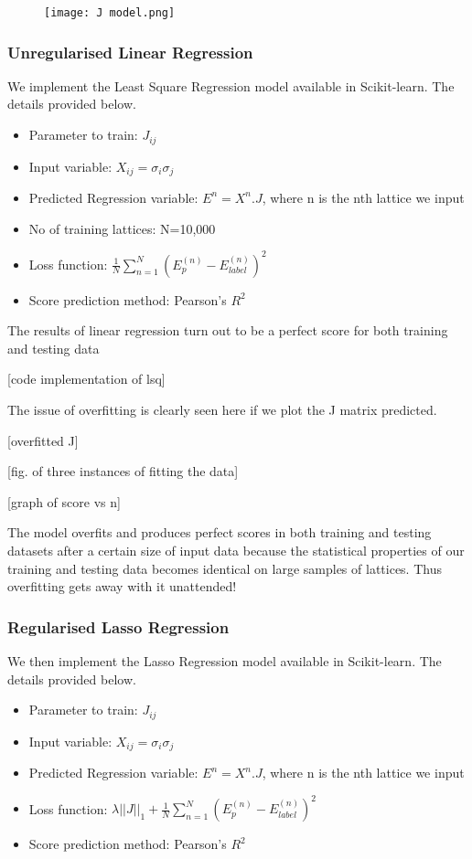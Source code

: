 \begin{figure}
    \centering
    \texttt{[image: J model.png]}
    \label{J matrix for nearest neighbour interaction}
\end{figure}

\subsubsection{Unregularised Linear Regression}
We implement the Least Square Regression model available in Scikit-learn. The details provided below.
\begin{itemize}
    \item Parameter to train: \(J_{ij}\)
    \item Input variable: \(X_{ij}=\sigma_i\sigma_j\)
    \item Predicted Regression variable: \(E^n=X^n.J\), where n is the nth lattice we input
    \item No of training lattices: N=10,000
    \item Loss function: \(\frac{1}{N} \sum_{n=1}^N(E_p^{(n)}-E_{label}^{(n)})^2\)
    \item Score prediction method: Pearson's \(R^2\)
\end{itemize}

The results of linear regression turn out to be a perfect score for both training and testing data 

[code implementation of lsq]

The issue of overfitting is clearly seen here if we plot the J matrix predicted.

[overfitted J]

[fig. of three instances of fitting the data]

[graph of score vs n]

The model overfits and produces perfect scores in both training and testing datasets after a certain size of input data because the statistical properties of our training and testing data becomes identical on large samples of lattices. Thus overfitting gets away with it unattended!

\subsubsection{Regularised Lasso Regression}
We then implement the Lasso Regression model available in Scikit-learn. The details provided below.
\begin{itemize}
    \item Parameter to train: \(J_{ij}\)
    \item Input variable: \(X_{ij}=\sigma_i\sigma_j\)
    \item Predicted Regression variable: \(E^n=X^n.J\), where n is the nth lattice we input
    \item Loss function: \(\lambda ||J||_1 + \frac{1}{N} \sum_{n=1}^N(E_p^{(n)}-E_{label}^{(n)})^2\)
    \item Score prediction method: Pearson's \(R^2\)
\end{itemize}

